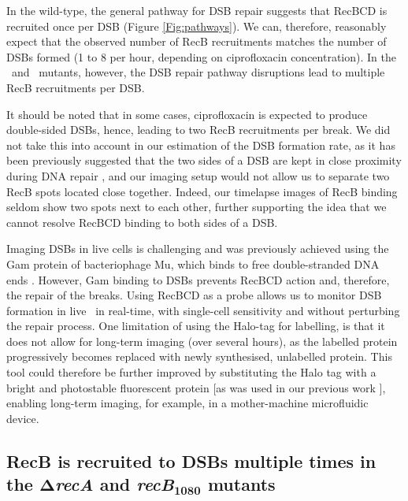 In the wild-type, the general pathway for DSB repair suggests that RecBCD is recruited once per DSB (Figure \ref{Fig:pathways}). We can, therefore, reasonably expect that the observed number of RecB recruitments matches the number of DSBs formed (1 to 8 per hour, depending on ciprofloxacin concentration). In the \dreca\ and \geneteneighty\ mutants, however, the DSB repair pathway disruptions lead to multiple RecB recruitments per DSB.

It should be noted that in some cases, ciprofloxacin is expected to produce double-sided DSBs, hence, leading to two RecB recruitments per break. We did not take this into account in our estimation of the DSB formation rate, as it has been previously suggested that the two sides of a DSB are kept in close proximity during DNA repair \cite{Vickridge2017,Keyamura2019}, and our imaging setup would not allow us to separate two RecB spots located close together. Indeed, our timelapse images of RecB binding seldom show two spots next to each other, further supporting the idea that we cannot resolve RecBCD binding to both sides of a DSB.

Imaging DSBs in live cells is challenging and was previously achieved using the Gam protein of bacteriophage Mu, which binds to free double-stranded DNA ends \cite{Shee2013,Henrikus2020}. However, Gam binding to DSBs prevents RecBCD action and, therefore, the repair of the breaks. Using RecBCD as a probe allows us to monitor DSB formation in live \ecoli\ in real-time, with single-cell sensitivity and without perturbing the repair process. One limitation of using the Halo-tag for labelling, is that it does not allow for long-term imaging (over several hours), as the labelled protein progressively becomes replaced with newly synthesised, unlabelled protein. This tool could therefore be further improved by substituting the Halo tag with a bright and photostable fluorescent protein [as was used in our previous work \cite{Lepore2019a}], enabling long-term imaging, for example, in a mother-machine microfluidic device.


\subsection*{RecB is recruited to DSBs multiple times in the $\mathbf{\Delta}$\emph{recA} and \emph{recB}$\mathbf{_{1080}}$ mutants}

